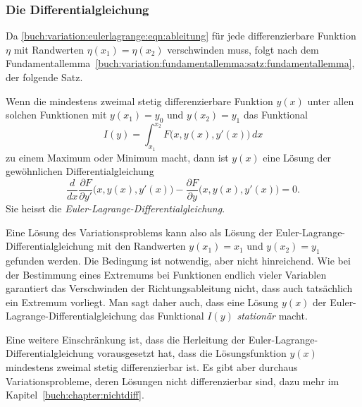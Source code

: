 %
%
\subsubsection{Die Differentialgleichung}
Da
\eqref{buch:variation:eulerlagrange:eqn:ableitung}
für jede differenzierbare Funktion $\eta$ mit Randwerten
$\eta(x_1)=\eta(x_2)$ verschwinden muss, folgt nach dem
Fundamentallemma~\ref{buch:variation:fundamentallemma:satz:fundamentallemma},
der folgende Satz. 

\begin{satz}
\label{buch:variation:eulerlagrange:satz:eulerlagrange}
Wenn die mindestens zweimal stetig differenzierbare Funktion $y(x)$
unter allen solchen Funktionen mit $y(x_1)=y_0$ und $y(x_2)=y_1$
das Funktional
\[
I(y)
=
\int_{x_1}^{x_2}
F\bigl(x,y(x),y'(x)\bigr)\,dx
\]
zu einem Maximum oder Minimum macht, dann ist $y(x)$ eine Lösung der
gewöhnlichen Differentialgleichung
\begin{equation}
\frac{d}{dx}
\frac{\partial F}{\partial y'}\bigl(x,y(x),y'(x)\bigr)
-
\frac{\partial F}{\partial y}\bigl(x,y(x),y'(x)\bigr)
=
0.
\label{buch:variation:eulerlagrange:eqn:eulerlagrange}
\end{equation}
Sie heisst die {\em Euler-Lagrange-Differentialgleichung}.
\end{satz}

Eine Lösung des Variationsproblems kann also als Lösung der
Euler-Lagrange-Dif\-fe\-ren\-tial\-glei\-chung mit den Randwerten
$y(x_1)=x_1$ und $y(x_2)=y_1$ gefunden werden.
Die Bedingung ist notwendig, aber nicht hinreichend.
Wie bei der Bestimmung eines Extremums bei Funktionen endlich
vieler Variablen garantiert das Verschwinden der Richtungsableitung
nicht, dass auch tatsächlich ein Extremum vorliegt.
Man sagt daher auch, dass eine Lösung $y(x)$ der
Euler-Lagrange-Differentialgleichung das Funktional $I(y)$
{\em stationär} macht.

Eine weitere Einschränkung ist, dass die Herleitung der
Euler-Lagrange-Differential\-gleichung vorausgesetzt hat,
dass die Lösungsfunktion $y(x)$ mindestens zweimal 
stetig differenzierbar ist.
Es gibt aber durchaus Variationsprobleme, deren Lösungen
nicht differenzierbar sind, dazu mehr im Kapitel~\ref{buch:chapter:nichtdiff}.

